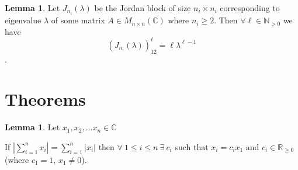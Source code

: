 \documentclass{amsart}
\theoremstyle{definition}
\newtheorem{lemma}[theorem]{Lemma}
\theoremstyle{remark}
\numberwithin{equation}{section}
\begin{document}
\begin{lemma}\label{jordanblockexp}
Let $J_{n_i}(\lambda)$ be the Jordan block of size $n_i \times n_i$ corresponding to eigenvalue $\lambda$ of some matrix $A \in M_{n \times n}(\mathbb{C})$ where $n_i \geq 2$.
Then  $\forall \ell \in \mathbb{N}_{> 0}$ we have 
$$(J_{n_i}(\lambda))^{\ell}_{12} = \ell \lambda^{\ell -1}$$.

\end{lemma}



\section{Theorems}


\begin{lemma}\label{section615b}
Let $x_1, x_2, \ldots x_n \in \mathbb{C}$

If $|\sum_{i = 1}^n x_i| = \sum_{i = 1}^{n}| x_i|$ then $\forall\ 1 \leq i \leq n\ \exists\ c_i$ such that $x_i = c_ix_1$ and $c_i \in \mathbb{R}_{\geq 0}$ (where $c_1 = 1$, $x_1 \neq 0$).

\end{lemma}
\end{document}
